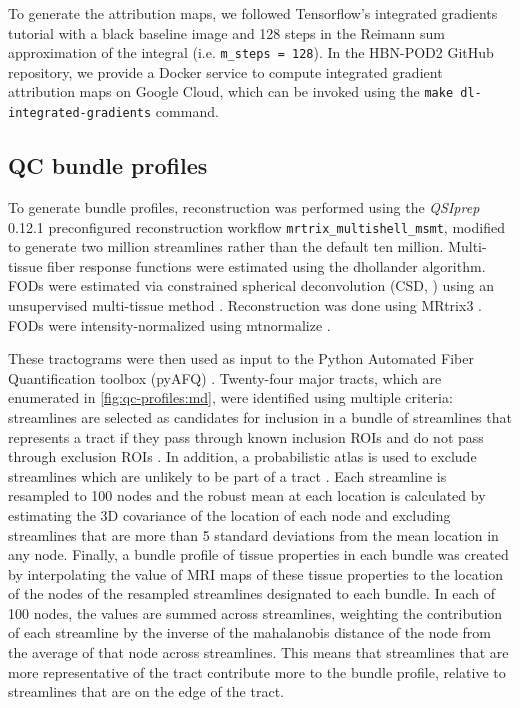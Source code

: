 \documentclass[fleqn,10pt]{wlscirep}
\begin{document}
To generate the attribution maps, we followed Tensorflow's integrated gradients
tutorial \cite{integrated-gradients-tutorial} with a black baseline image and
128 steps in the Reimann sum approximation of the integral (i.e.
\texttt{m\_steps = 128}). In the HBN-POD2 GitHub repository, we provide a Docker
service to compute integrated gradient attribution maps on Google Cloud, which
can be invoked using the \texttt{make dl-integrated-gradients} command.

\subsection*{QC bundle profiles}

To generate bundle profiles, reconstruction was performed using the
\emph{QSIprep} 0.12.1 preconfigured reconstruction workflow
\texttt{mrtrix\_multishell\_msmt}, modified to generate two million streamlines
rather than the default ten million. Multi-tissue fiber response functions were
estimated using the dhollander algorithm. FODs were estimated via constrained
spherical deconvolution (CSD, \cite{originalcsd, tournier2008csd}) using an
unsupervised multi-tissue method \cite{dhollander2019response,
dhollander2016unsupervised}. Reconstruction was done using MRtrix3
\cite{mrtrix3}. FODs were intensity-normalized using mtnormalize
\cite{mtnormalize}.

These tractograms were then used as input to the Python Automated Fiber
Quantification toolbox (pyAFQ) \cite{kruper2021evaluating}. Twenty-four major
tracts, which are enumerated in \ref{fig:qc-profiles:md}, were identified using
multiple criteria: streamlines are selected as candidates for inclusion in a
bundle of streamlines that represents a tract if they pass through known
inclusion ROIs and do not pass through exclusion ROIs \cite{Wakana2007-nw}. In
addition, a probabilistic atlas is used to exclude streamlines which are
unlikely to be part of a tract \cite{Hua2008-di}. Each streamline is resampled
to 100 nodes and the robust mean at each location is calculated by estimating
the 3D covariance of the location of each node and excluding streamlines that
are more than 5 standard deviations from the mean location in any node. Finally,
a bundle profile of tissue properties in each bundle was created by
interpolating the value of MRI maps of these tissue properties to the location
of the nodes of the resampled streamlines designated to each bundle. In each of
100 nodes, the values are summed across streamlines, weighting the contribution
of each streamline by the inverse of the mahalanobis distance of the node from
the average of that node across streamlines. This means that streamlines that
are more representative of the tract contribute more to the bundle profile,
relative to streamlines that are on the edge of the tract.
\end{document}
